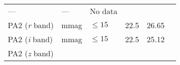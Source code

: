 \documentclass[DM,toc]{lsstdoc}
\begin{document}
\begin{longtable}[]{@{}llllll@{}}
\begin{minipage}[t]{0.17\columnwidth}
---\strut
\end{minipage} & \begin{minipage}[t]{0.12\columnwidth}\raggedright\strut
---\strut
\end{minipage} & \begin{minipage}[t]{0.17\columnwidth}\raggedright\strut
No data\strut
\end{minipage}\tabularnewline
\begin{minipage}[t]{0.14\columnwidth}\raggedright\strut
PA2 (\emph{r} band)\strut
\end{minipage} & \begin{minipage}[t]{0.06\columnwidth}\raggedright\strut
mmag\strut
\end{minipage} & \begin{minipage}[t]{0.17\columnwidth}\raggedright\strut
\(\leq 15\)\strut
\end{minipage} & \begin{minipage}[t]{0.17\columnwidth}\raggedright\strut
22.5\strut
\end{minipage} & \begin{minipage}[t]{0.12\columnwidth}\raggedright\strut
26.65\strut
\end{minipage} & \begin{minipage}[t]{0.17\columnwidth}\raggedright\strut
\strut
\end{minipage}\tabularnewline
\begin{minipage}[t]{0.14\columnwidth}\raggedright\strut
PA2 (\emph{i} band)\strut
\end{minipage} & \begin{minipage}[t]{0.06\columnwidth}\raggedright\strut
mmag\strut
\end{minipage} & \begin{minipage}[t]{0.17\columnwidth}\raggedright\strut
\(\leq 15\)\strut
\end{minipage} & \begin{minipage}[t]{0.17\columnwidth}\raggedright\strut
22.5\strut
\end{minipage} & \begin{minipage}[t]{0.12\columnwidth}\raggedright\strut
25.12\strut
\end{minipage} & \begin{minipage}[t]{0.17\columnwidth}\raggedright\strut
\strut
\end{minipage}\tabularnewline
\begin{minipage}[t]{0.14\columnwidth}\raggedright\strut
PA2 (\emph{z} band)\strut
\end{minipage} & \begin{minipage}[t]{0.06\columnwidth}\raggedright\strut

\end{minipage}
\end{longtable}
\end{document}
